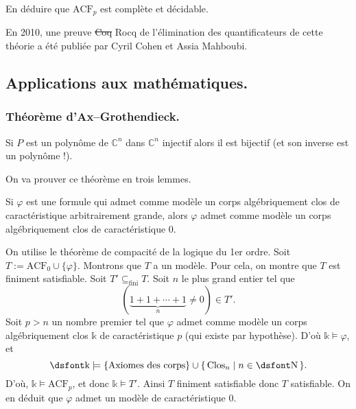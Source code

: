 \documentclass[./main]{subfiles}
\begin{document}
  \begin{exo}
    En déduire que $\mathrm{ACF}_p$ est complète et décidable.
  \end{exo}

  \begin{rmk}
    En 2010, une preuve \st{\textsf{Coq}} \textsf{Rocq} de l'élimination des quantificateurs de cette théorie a été publiée par Cyril Cohen et Assia Mahboubi.
  \end{rmk}

  \subsection{Applications aux mathématiques.}

  \subsubsection{Théorème d'Ax--Grothendieck.}

  \begin{thm}[Ax--Grothendieck]
    Si $P$ est un polynôme de $\mathds{C}^n$ dans $\mathds{C}^n$ injectif alors il est bijectif (et son inverse est un polynôme !).
  \end{thm}

  On va prouver ce théorème en trois lemmes.

  \begin{lem}
    Si $\varphi$ est une formule qui admet comme modèle un corps algébriquement clos de caractéristique arbitrairement grande, alors $\varphi$ admet comme modèle un corps algébriquement clos de caractéristique $0$.
  \end{lem}
  \begin{prv}
    On utilise le théorème de compacité de la logique du 1er ordre.
    Soit $T := \mathrm{ACF}_0 \cup \{\varphi\}$.
    Montrons que $T$ a un modèle.
    Pour cela, on montre que $T$ est finiment satisfiable.
    Soit $T' \subseteq_\mathrm{fini} T$.
    Soit $n$ le plus grand entier tel que
    \[
      (\underbrace{1 + 1 + \cdots + 1}_n \neq 0) \in T'
    .\]
    Soit $p > n$ un nombre premier tel que $\varphi$ admet comme modèle un corps algébriquement clos $\mathds{k}$ de caractéristique $p$ (qui existe par hypothèse).
    D'où $\mathds{k} \models \varphi$,  et
    \[
    \mathds{k} \models \{\text{Axiomes des corps}\} \cup \mleft\{\,\mathrm{Clos}_n \;\middle|\; n \in \mathds{N}\,\mright\}   
    .\]
    D'où, $\mathds{k} \models \mathrm{ACF}_p$, et donc $\mathds{k} \models T'$.
    Ainsi $T$ finiment satisfiable donc $T$ satisfiable.
    On en déduit que $\varphi$ admet un modèle de caractéristique $0$.
  \end{prv}
\end{document}
